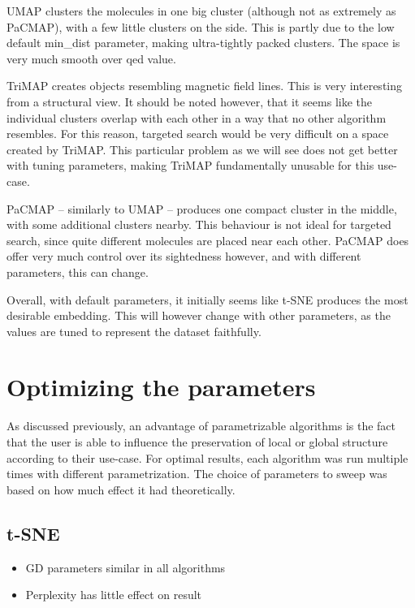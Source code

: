 UMAP clusters the molecules in one big cluster (although not as extremely as PaCMAP), with a few little clusters on the side. This is partly due to the low default min\_dist parameter, making ultra-tightly packed clusters. The space is very much smooth over qed value. 

TriMAP creates objects resembling magnetic field lines. This is very interesting from a structural view. It should be noted however, that it seems like the individual clusters overlap with each other in a way that no other algorithm resembles. For this reason, targeted search would be very difficult on a space created by TriMAP. This particular problem as we will see does not get better with tuning parameters, making TriMAP fundamentally unusable for this use-case.

PaCMAP -- similarly to UMAP -- produces one compact cluster in the middle, with some additional clusters nearby. This behaviour is not ideal for targeted search, since quite different molecules are placed near each other. PaCMAP does offer very much control over its sightedness however, and with different parameters, this can change.

Overall, with default parameters, it initially seems like t-SNE produces the most desirable embedding. This will however change with other parameters, as the values are tuned to represent the dataset faithfully.

\section{Optimizing the parameters}\label{sec:optimizing-the-parameters}

As discussed previously, an advantage of parametrizable algorithms is the fact that the user is able to influence the preservation of local or global structure according to their use-case. For optimal results, each algorithm was run multiple times with different parametrization. The choice of parameters to sweep was based on how much effect it had theoretically. 

\subsection{t-SNE}

\begin{itemize}
	\item GD parameters similar in all algorithms
	\item Perplexity has little effect on result
\end{itemize}


